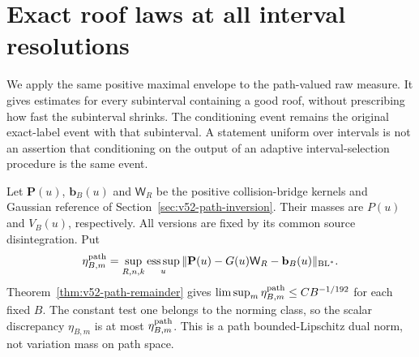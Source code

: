 \section{Exact roof laws at all interval resolutions}
\label{sec:v56-resolution-laws}
We apply the same positive maximal envelope to the path-valued raw
measure. It gives estimates for every subinterval containing a good
roof, without prescribing how fast the subinterval shrinks. The
conditioning event remains the original exact-label event with that
subinterval. A statement uniform over intervals is not an assertion
that conditioning on the output of an adaptive interval-selection
procedure is the same event.

Let $\mathbf P(u)$, $\mathbf b_B(u)$ and $\mathsf W_R$ be the
positive collision-bridge kernels and Gaussian reference of
Section~\ref{sec:v52-path-inversion}. Their masses are $P(u)$ and
$V_B(u)$, respectively. All versions are fixed by its common source
disintegration. Put
\begin{equation}\label{eq:v56-path-discrepancy}
 \eta^{\rm path}_{B,m}
  =\sup_{R,n,k}\operatorname*{ess\,sup}_u
       \|\mathbf P(u)-G(u)\mathsf W_R-\mathbf b_B(u)\|_{\mathrm{BL}^*}.
\end{equation}
Theorem~\ref{thm:v52-path-remainder} gives
$\limsup_m\eta^{\rm path}_{B,m}\le CB^{-1/192}$ for each fixed
$B$. The constant test one belongs to the norming class, so the
scalar discrepancy $\eta_{B,m}$ is at most
$\eta^{\rm path}_{B,m}$. This is a path bounded-Lipschitz dual norm,
not variation mass on path space.

